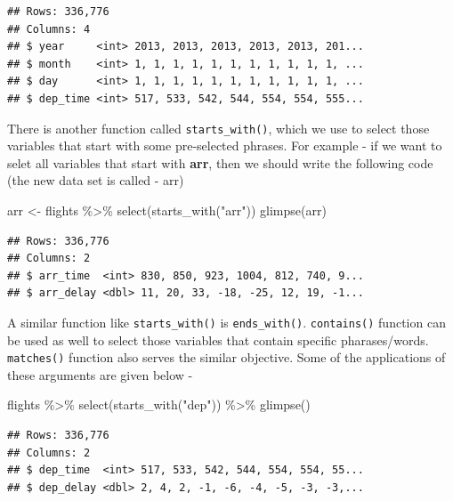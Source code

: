 \documentclass[
]{book}
\newenvironment{Shaded}{\begin{snugshade}}{\end{snugshade}}
\newcommand{\FunctionTok}[1]{\textcolor[rgb]{0.00,0.00,0.00}{#1}}
\newcommand{\NormalTok}[1]{#1}
\newcommand{\OtherTok}[1]{\textcolor[rgb]{0.56,0.35,0.01}{#1}}
\newcommand{\SpecialCharTok}[1]{\textcolor[rgb]{0.00,0.00,0.00}{#1}}
\newcommand{\StringTok}[1]{\textcolor[rgb]{0.31,0.60,0.02}{#1}}
\begin{document}
\begin{verbatim}
## Rows: 336,776
## Columns: 4
## $ year     <int> 2013, 2013, 2013, 2013, 2013, 201...
## $ month    <int> 1, 1, 1, 1, 1, 1, 1, 1, 1, 1, 1, ...
## $ day      <int> 1, 1, 1, 1, 1, 1, 1, 1, 1, 1, 1, ...
## $ dep_time <int> 517, 533, 542, 544, 554, 554, 555...
\end{verbatim}

There is another function called \texttt{starts\_with()}, which we use to select those variables that start with some pre-selected phrases. For example - if we want to selet all variables that start with \textbf{arr}, then we should write the following code (the new data set is called - arr)

\begin{Shaded}
\begin{Highlighting}[]
\NormalTok{arr }\OtherTok{\textless{}{-}}\NormalTok{ flights }\SpecialCharTok{\%\textgreater{}\%} 
  \FunctionTok{select}\NormalTok{(}\FunctionTok{starts\_with}\NormalTok{(}\StringTok{"arr"}\NormalTok{))}
\FunctionTok{glimpse}\NormalTok{(arr)}
\end{Highlighting}
\end{Shaded}

\begin{verbatim}
## Rows: 336,776
## Columns: 2
## $ arr_time  <int> 830, 850, 923, 1004, 812, 740, 9...
## $ arr_delay <dbl> 11, 20, 33, -18, -25, 12, 19, -1...
\end{verbatim}

A similar function like \texttt{starts\_with()} is \texttt{ends\_with()}. \texttt{contains()} function can be used as well to select those variables that contain specific pharases/words. \texttt{matches()} function also serves the similar objective. Some of the applications of these arguments are given below -

\begin{Shaded}
\begin{Highlighting}[]
\NormalTok{flights }\SpecialCharTok{\%\textgreater{}\%} 
  \FunctionTok{select}\NormalTok{(}\FunctionTok{starts\_with}\NormalTok{(}\StringTok{"dep"}\NormalTok{)) }\SpecialCharTok{\%\textgreater{}\%} 
  \FunctionTok{glimpse}\NormalTok{()}
\end{Highlighting}
\end{Shaded}

\begin{verbatim}
## Rows: 336,776
## Columns: 2
## $ dep_time  <int> 517, 533, 542, 544, 554, 554, 55...
## $ dep_delay <dbl> 2, 4, 2, -1, -6, -4, -5, -3, -3,...
\end{verbatim}
\end{document}
